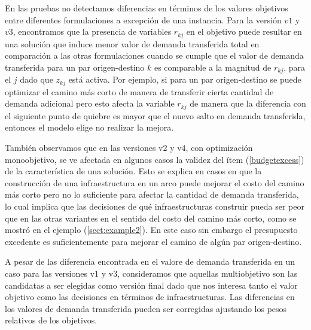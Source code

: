 \documentclass{article}
\begin{document}
  En las pruebas no detectamos diferencias en términos de los valores objetivos entre diferentes formulaciones a excepción de una instancia. Para la versión $v1$ y $v3$, encontramos que la presencia de variables $r_{kj}$ en el objetivo puede resultar en una solución que induce menor valor de demanda transferida total en comparación a las otras formulaciones cuando se cumple que el valor de demanda transferida para un par origen-destino $k$ es comparable a la magnitud de $r_{kj}$, para el $j$ dado que $z_{kj}$ está activa. Por ejemplo, si para un par origen-destino se puede optimizar el camino más corto de manera de transferir cierta cantidad de demanda adicional pero esto afecta la variable $r_{kj}$ de manera que la diferencia con el siguiente punto de quiebre es mayor que el nuevo salto en demanda transferida, entonces el modelo elige no realizar la mejora.

  También observamos que en las versiones v2 y v4, con optimización monoobjetivo, se ve afectada en algunos casos la validez del ítem (\ref{budgetexcess}) de la característica de una solución. Esto se explica en casos en que la construcción de una infraestructura en un arco puede mejorar el costo del camino más corto pero no lo suficiente para afectar la cantidad de demanda transferida, lo cual implica que las decisiones de qué infraestructuras construir pueda ser peor que en las otras variantes en el sentido del costo del camino más corto, como se mostró en el ejemplo (\ref{sect:example2}). En este caso sin embargo el presupuesto excedente es suficientemente para mejorar el camino de algún par origen-destino.

  A pesar de las diferencia encontrada en el valore de demanda transferida en un caso para las versiones v1 y v3, consideramos que aquellas multiobjetivo son las candidatas a ser elegidas como versión final dado que nos interesa tanto el valor objetivo como las decisiones en términos de infraestructuras. Las diferencias en los valores de demanda transferida pueden ser corregidas ajustando los pesos relativos de los objetivos.
\end{document}
